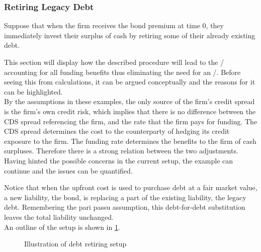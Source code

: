 \documentclass[main.tex]{subfiles}
\begin{document}
        \subsubsection{Retiring Legacy Debt}
            Suppose that when the firm receives the bond premium at time 0, 
            they immediately invest their surplus of cash by retiring some of their already existing debt.
            
            This section will display how the described procedure will lead to the \DVA/
            accounting for all funding benefits thus eliminating the need for an \FVA/.
            Before seeing this from calculations, it can be argued conceptually
            and the reasons for it can be highlighted.
            \\
            By the assumptions in these examples,
            the only source of the firm's credit spread is the firm's own credit risk, 
            which implies that there is no difference between the CDS spread referencing the firm,
            and the rate that the firm pays for funding.
            The CDS spread determines the cost to the counterparty 
            of hedging its credit exposure to the firm.
            The funding rate determines the benefits to the firm of cash surpluses.
            Therefore there is a strong relation between the two adjustments.
            \\
            Having hinted the possible concerns in the current setup, 
            the example can continue and the issues can be quantified.

            Notice that when the upfront cost is used to purchase debt at a fair market value, 
            a new liability, the bond, is replacing a part of the existing liability, the legacy debt. 
            Remembering the pari passu assumption, this debt-for-debt substitution 
            leaves the total liability unchanged.
            \\
            An outline of the setup is shown in \cref{fig:debt-retiring-setup}.
            \begin{figure}[t]
                \centering
                \caption{Illustration of debt retiring setup}
                \label{fig:debt-retiring-setup}
            \end{figure}
\end{document}
